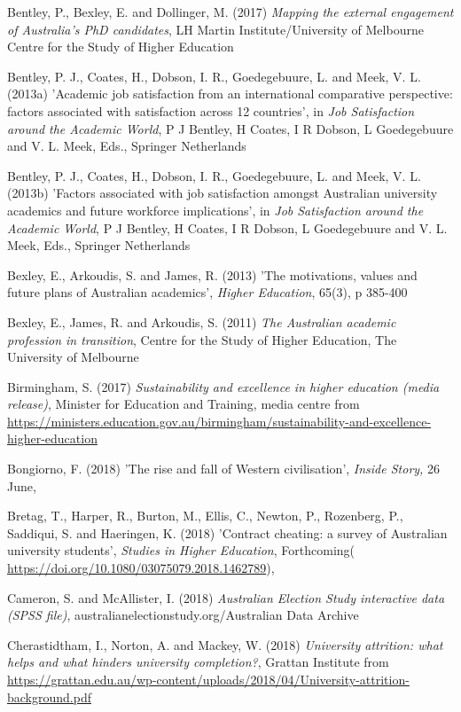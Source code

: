 \documentclass[]{book}
\begin{document}
Bentley, P., Bexley, E. and Dollinger, M. (2017) \emph{Mapping the external engagement of Australia's PhD candidates}, LH Martin Institute/University of Melbourne Centre for the Study of Higher Education

Bentley, P. J., Coates, H., Dobson, I. R., Goedegebuure, L. and Meek, V. L. (2013a) 'Academic job satisfaction from an international comparative perspective: factors associated with satisfaction across 12 countries', in \emph{Job Satisfaction around the Academic World}, P J Bentley, H Coates, I R Dobson, L Goedegebuure and V. L. Meek, Eds., Springer Netherlands

Bentley, P. J., Coates, H., Dobson, I. R., Goedegebuure, L. and Meek, V. L. (2013b) 'Factors associated with job satisfaction amongst Australian university academics and future workforce implications', in \emph{Job Satisfaction around the Academic World}, P J Bentley, H Coates, I R Dobson, L Goedegebuure and V. L. Meek, Eds., Springer Netherlands

Bexley, E., Arkoudis, S. and James, R. (2013) 'The motivations, values and future plans of Australian academics', \emph{Higher Education}, 65(3), p 385-400

Bexley, E., James, R. and Arkoudis, S. (2011) \emph{The Australian academic profession in transition}, Centre for the Study of Higher Education, The University of Melbourne

Birmingham, S. (2017) \emph{Sustainability and excellence in higher education (media release)}, Minister for Education and Training, media centre from \url{https://ministers.education.gov.au/birmingham/sustainability-and-excellence-higher-education}

Bongiorno, F. (2018) 'The rise and fall of Western civilisation', \emph{Inside Story,} 26 June,

Bretag, T., Harper, R., Burton, M., Ellis, C., Newton, P., Rozenberg, P., Saddiqui, S. and Haeringen, K. (2018) 'Contract cheating: a survey of Australian university students', \emph{Studies in Higher Education}, Forthcoming( \url{https://doi.org/10.1080/03075079.2018.1462789}),

\protect\hypertarget{_ENREF_41}{}{}Cameron, S. and McAllister, I. (2018) \emph{Australian Election Study interactive data (SPSS file)}, australianelectionstudy.org/Australian Data Archive

\protect\hypertarget{_ENREF_42}{}{}Cherastidtham, I., Norton, A. and Mackey, W. (2018) \emph{University attrition: what helps and what hinders university completion?}, Grattan Institute from \url{https://grattan.edu.au/wp-content/uploads/2018/04/University-attrition-background.pdf}
\end{document}
